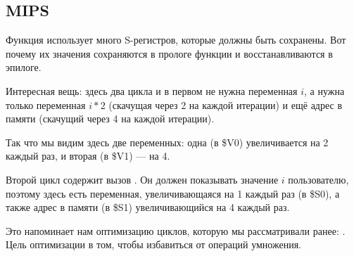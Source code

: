 ﻿\subsection{MIPS}
Функция использует много S-регистров, которые должны быть сохранены. Вот почему их значения сохраняются
в прологе функции и восстанавливаются в эпилоге.



Интересная вещь: здесь два цикла и в первом не нужна переменная $i$, а нужна только переменная
$i*2$ (скачущая через 2 на каждой итерации) и ещё адрес в памяти (скачущий через 4 на каждой итерации).

Так что мы видим здесь две переменных: одна (в \$V0) увеличивается на 2 каждый раз, и вторая (в \$V1) --- на 4.

Второй цикл содержит вызов \printf. Он должен показывать значение $i$ пользователю,
поэтому здесь есть переменная, увеличивающаяся на 1 каждый раз (в \$S0), а также адрес в памяти (в \$S1) 
увеличивающийся на 4 каждый раз.

Это напоминает нам оптимизацию циклов, которую мы рассматривали ранее: .
Цель оптимизации в том, чтобы избавиться от операций умножения.

